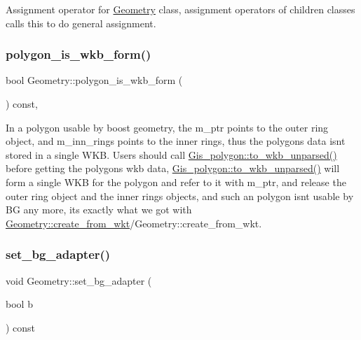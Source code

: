 Assignment operator for \mbox{\hyperlink{classGeometry}{Geometry}} class, assignment operators of children classes calls this to do general assignment. \mbox{\label{classGeometry_a0b03ccd55d98e9f0c8ccf44f5d4c1ffc}} 
\subsubsection{\texorpdfstring{polygon\+\_\+is\+\_\+wkb\+\_\+form()}{polygon\_is\_wkb\_form()}}
{\footnotesize\ttfamily bool Geometry\+::polygon\+\_\+is\+\_\+wkb\+\_\+form (\begin{DoxyParamCaption}{ }\end{DoxyParamCaption}) const\hspace{0.3cm}{\ttfamily [inline]}, {\ttfamily [protected]}}

In a polygon usable by boost geometry, the m\+\_\+ptr points to the outer ring object, and m\+\_\+inn\+\_\+rings points to the inner rings, thus the polygon\textquotesingle{}s data isn\textquotesingle{}t stored in a single W\+KB. Users should call \mbox{\hyperlink{classGis__polygon_a7bd6ed68da450be85891eb39142d3e60}{Gis\+\_\+polygon\+::to\+\_\+wkb\+\_\+unparsed()}} before getting the polygon\textquotesingle{}s wkb data, \mbox{\hyperlink{classGis__polygon_a7bd6ed68da450be85891eb39142d3e60}{Gis\+\_\+polygon\+::to\+\_\+wkb\+\_\+unparsed()}} will form a single W\+KB for the polygon and refer to it with m\+\_\+ptr, and release the outer ring object and the inner rings objects, and such an polygon isn\textquotesingle{}t usable by BG any more, it\textquotesingle{}s exactly what we got with \mbox{\hyperlink{classGeometry_a71d6852fd0285a9bffaca556592cae39}{Geometry\+::create\+\_\+from\+\_\+wkt}}/\+Geometry\+::create\+\_\+from\+\_\+wkt. \mbox{\label{classGeometry_ac352af286569f0f9f6a2e927a55b38ea}} 
\subsubsection{\texorpdfstring{set\+\_\+bg\+\_\+adapter()}{set\_bg\_adapter()}}
{\footnotesize\ttfamily void Geometry\+::set\+\_\+bg\+\_\+adapter (\begin{DoxyParamCaption}\item[{bool}]{b }\end{DoxyParamCaption}) const\hspace{0.3cm}{\ttfamily [inline]}}

